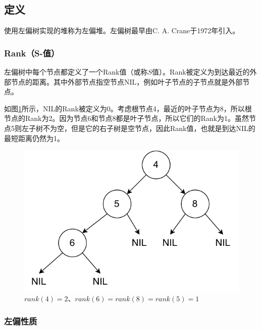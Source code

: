 \documentclass[b5paper]{ctexart}
\begin{document}
\subsection{定义}

使用左偏树实现的堆称为左偏堆。左偏树最早由C. A. Crane于1972年引入\cite{wiki-leftist-tree}。

\subsubsection{Rank（S-值）}

左偏树中每个节点都定义了一个Rank值（或称$S$值）。Rank被定义为到达最近的外部节点的距离。其中外部节点指空节点NIL，例如叶子节点的子节点就是外部节点。

如图\ref{fig:rank}所示，NIL的Rank被定义为0。考虑根节点4，最近的叶子节点为8，所以根节点的Rank为2。因为节点6和节点8都是叶子节点，所以它们的Rank为1。虽然节点5则左子树不为空，但是它的右子树是空节点，因此Rank值，也就是到达NIL的最短距离仍然为1。

\begin{figure}[htbp]
   \begin{center}
     \includegraphics[scale=0.5]{img/rank}
     \caption{$rank(4) = 2$、$rank(6) = rank(8) = rank(5) = 1$} \label{fig:rank}
   \end{center}
\end{figure}

\subsubsection{左偏性质}
\end{document}
